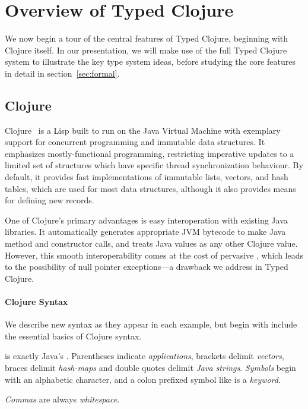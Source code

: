 \section{Overview of Typed Clojure}

\label{sec:overview}

We now begin a tour of the central features of Typed Clojure,
beginning with Clojure itself. In our presentation, we will make 
use of the full Typed Clojure system to illustrate the key type system
ideas, before studying the core features in detail in
section~\ref{sec:formal}. 

\subsection{Clojure}

Clojure~\cite{Hic08} is a Lisp built to run on the
Java Virtual Machine with exemplary support for concurrent programming
and immutable data structures. It emphasizes mostly-functional
programming, restricting imperative updates to a limited set of
structures which have specific thread synchronization behaviour. By
default, it provides fast implementations of immutable lists, vectors,
and hash tables, which are used for most data structures, although it
also provides means for defining new records.

One of Clojure's primary advantages is easy interoperation with
existing Java libraries. It automatically generates appropriate JVM
bytecode to make Java method and constructor calls, and treats Java
values as any other Clojure value. However, this smooth
interoperability comes at the cost of pervasive , which
leads to the possibility of null pointer exceptions---a drawback we
address in Typed Clojure.

\paragraph{Clojure Syntax}

We describe new syntax as they appear in each example, but
begin with include the essential basics of Clojure syntax.

 is exactly Java's .
Parentheses indicate \emph{applications}, brackets
delimit
\emph{vectors}, braces
delimit
\emph{hash-maps}
and double quotes delimit \emph{Java strings}.
\emph{Symbols} begin with an alphabetic character,
and a colon prefixed symbol like  is a \emph{keyword}.

\emph{Commas} are always \emph{whitespace}.

